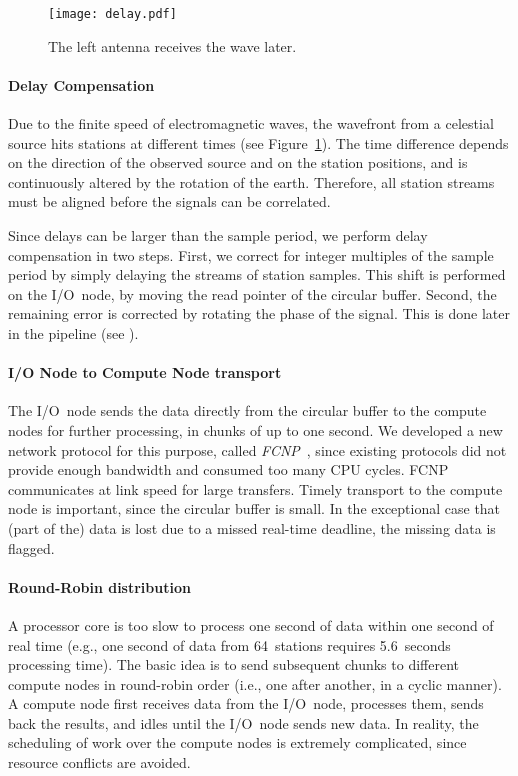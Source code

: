 \begin{figure}
\vspace{-9mm}
\begin{center}
\texttt{[image: delay.pdf]}
\end{center}
\caption{The left antenna receives the wave later.\vspace{-4mm}}
\label{fig:delay}
\end{figure}
\paragraph{Delay Compensation }
Due to the finite speed of electromagnetic waves, the wavefront from a
celestial source hits stations at different times
(see Figure~\ref{fig:delay}).
The time difference depends on the direction of the observed source and on the
station positions, and is continuously altered by the rotation of the earth.
Therefore, all station streams must be aligned before the signals can be
correlated.

Since delays can be larger than the sample period, we perform delay
compensation in two steps.
First, we correct for integer multiples of the sample period by simply
delaying the streams of station samples.
This shift is performed on the I/O~node, by moving the read pointer of the
circular buffer.
Second, the remaining error is corrected by rotating the phase of the signal.
This is done later in the pipeline (see ).


\paragraph{I/O Node to Compute Node transport }
The I/O~node sends the data directly from the circular buffer to the compute
nodes for further processing, in chunks of up to one second.
We developed a new network protocol for this purpose, called
\emph{FCNP\/}~\cite{Romein:09a}, since existing protocols did not provide
enough bandwidth and consumed too many CPU cycles.
FCNP communicates at link speed for large transfers.
Timely transport to the compute node is important, since the circular buffer
is small.
In the exceptional case that (part of the) data is lost due to a missed
real-time deadline, the missing data is flagged.


\paragraph{Round-Robin distribution}
A processor core is too slow to process one second of data within one second of
real time (e.g., one second of data from 64~stations requires 5.6~seconds
processing time).
The basic idea is to send subsequent chunks to different compute nodes in
round-robin order (i.e., one after another, in a cyclic manner).
A compute node first receives data from the I/O~node, processes them, sends
back the results, and idles until the I/O~node sends new data.
In reality, the scheduling of work over the compute nodes is extremely
complicated, since resource conflicts are avoided.


